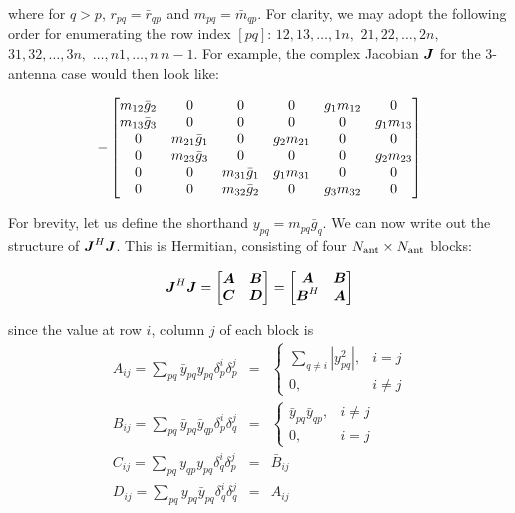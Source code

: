 \documentclass[useAMS,usenatbib]{mn2e}
\newcommand{\mat}[1]{{\bmath{#1}}}
\newcommand{\JJ}{\mat{J}} %
\begin{document}
where for $q>p$, $r_{pq}=\bar{r}_{qp}$ and $m_{pq}=\bar{m}_{qp}$. For clarity, we may adopt the 
following order for enumerating the row index $[pq]$: $12,13,\dots,1n,$ $21,22,\dots,2n,$ $31,32,\dots,3n,$ $\dots,n1,\dots,n\,n-1$. 
For example, the complex Jacobian $\JJ$ for the 3-antenna case would then look like:

\[
-\Matrix{cccccc}{
  m_{12}\bar{g}_2 & 0               & 0 &  0          & g_1 m_{12} & 0           \\
  m_{13}\bar{g}_3 & 0               & 0 &  0          & 0          & g_1 m_{13}  \\
  0               & m_{21}\bar{g}_1 & 0 &  g_2 m_{21} & 0          & 0  \\
  0               & m_{23}\bar{g}_3 & 0 &  0          & 0          & g_2 m_{23} \\
  0               & 0               & m_{31}\bar{g}_1 & g_1 m_{31} & 0          & 0  \\
  0               & 0               & m_{32}\bar{g}_2 & 0 & g_3 m_{32} & 0 \\
}
\]


For brevity, let us define the shorthand $y_{pq} = m_{pq} \bar{g}_q$. 
We can now write out the structure of $\JJ^H\JJ$. This is Hermitian, consisting of four $N_\mathrm{ant}\times N_\mathrm{ant}$ blocks:

\[
\JJ^H\JJ = \Matrix{cc}{\mat{A}&\mat{B}\\\mat{C}&\mat{D}} = \Matrix{cc}{\mat{A}&\mat{B}\\\mat{B}^H&\mat{A}}
\]

since the value at row $i$, column $j$ of each block is
\begin{eqnarray}
A_{ij} = \sum_{pq} \bar{y}_{pq} y_{pq} \delta^{i}_p \delta^{j}_p &=& 
  \left \{ \begin{array}{cc}
        \sum\limits_{q\ne i} |y_{pq}^2|, & \scriptstyle i=j \\
        0,  & \scriptstyle  i\ne j
  \end{array} \right .\nonumber\\ 
B_{ij} = \sum_{pq} \bar{y}_{pq} \bar{y}_{qp} \delta^{i}_p \delta^{j}_q &=& 
  \left \{ \begin{array}{cc}
      \bar{y}_{pq} \bar{y}_{qp}, & \scriptstyle i\ne j\\
      0, & \scriptstyle i=j
  \end{array} \right .\nonumber\\ 
C_{ij} = \sum_{pq} y_{qp} y_{pq} \delta^{i}_q \delta^{j}_p &=& 
  \bar{B}_{ij} \nonumber\\
D_{ij} = \sum_{pq} y_{pq} \bar{y}_{pq} \delta^{i}_q \delta^{j}_q &=& A_{ij} 
\label{eq:JHJ:DI:ABCD}
\end{eqnarray}
\end{document}
